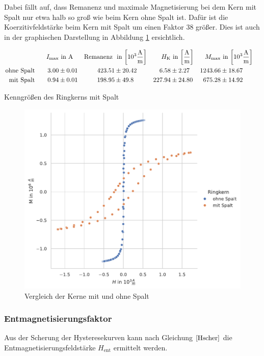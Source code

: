 \documentclass[12pt,a4paper]{scrartcl}
\numberwithin{equation}{section} %
\renewcommand{\[}{} %
\renewcommand{\]}{\noindent} %
\begin{document}
Dabei fällt auf, dass Remanenz und maximale Magnetisierung bei dem Kern mit Spalt nur etwa halb so groß wie beim Kern ohne Spalt ist. Dafür ist die Koerzitivfeldstärke beim Kern mit Spalt um einen Faktor \(38\) größer. Dies ist auch in der graphischen Darstellung in Abbildung \ref{Abb: Vergleich} ersichtlich.

\begin{table}
\begin{align*}
	I_\mathrm{max} &\text{ in } \mathrm A &
	\text{Remanenz } &\text{ in }
	{\tiny \left[10^3 \frac{\mathrm A}{\mathrm m} \right] } &
	H_\mathrm{K} &\text{ in }
	{\tiny \left[ \frac{\mathrm A}{\mathrm m} \right] } &
	M_\mathrm{max} &\text{ in }
	{\tiny \left[10^3 \frac{\mathrm A}{\mathrm m} \right] }
	\\
	\text{ohne Spalt}\qquad
	3.00 &\pm 0.01 &
	423.51 &\pm 20.42 &
	6.58 &\pm 2.27 &
	1243.66 &\pm 18.67
	\\
	\text{mit Spalt}\qquad
	0.94 &\pm 0.01 &
	198.95 &\pm 49.8 &
	227.94 &\pm 24.80 &
	675.28 &\pm 14.92 &
\end{align*}
\caption{Kenngrößen des Ringkerns mit Spalt}
\label{Tab: kenngr Spalt}
\end{table}

\begin{figure}
\centering
\includegraphics[scale=0.6]{../media/B2.4/3.3.3_comparison.pdf}
\caption{Vergleich der Kerne mit und ohne Spalt}
\label{Abb: Vergleich}
\end{figure}

\hypertarget{entmagnetisierungsfaktor-2}{%
\subsubsection{Entmagnetisierungsfaktor}\label{entmagnetisierungsfaktor-2}}
Aus der Scherung der Hysteresekurven kann nach Gleichung \(\eqref{Hscher}\) die Entmagnetisierungsfeldstärke \(H_\mathrm{ent}\) ermittelt werden.
\end{document}
